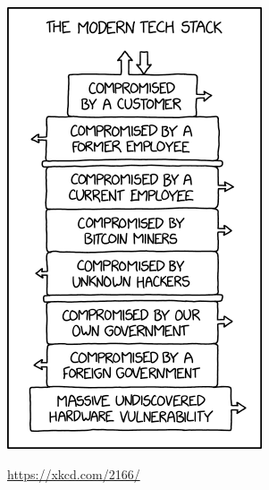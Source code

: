 \documentclass{slide}
\begin{document}
\begin{frame}

\begin{figure}
    \href{https://xkcd.com/2166/}{\includegraphics[height=\paperheight-11mm]{images/security_stack.png}}
    \caption{\url{https://xkcd.com/2166/}}
\end{figure}

\end{frame}


\end{document}

